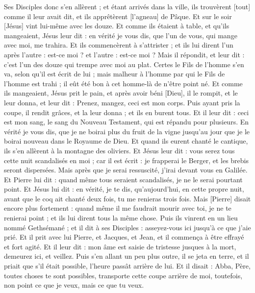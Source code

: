 \begin{multicols}{2}
Ses Disciples donc s'en allèrent ; et étant arrivés dans la ville, ils trouvèrent [tout] comme il leur avait dit, et ils apprêtèrent [l'agneau] de Pâque.
Et sur le soir [Jésus] vint lui-même avec les douze.
Et comme ils étaient à table, et qu'ils mangeaient, Jésus leur dit : en vérité je vous dis, que l'un de vous, qui mange avec moi, me trahira.
Et ils commencèrent à s'attrister ; et ils lui dirent l'un après l'autre : est-ce moi ? et l'autre : est-ce moi ?
Mais il répondit, et leur dit : c'est l'un des douze qui trempe avec moi au plat.
Certes le Fils de l'homme s'en va, selon qu'il est écrit de lui ; mais malheur à l'homme par qui le Fils de l'homme est trahi ; il eût été bon à cet homme-là de n'être point né.
Et comme ils mangeaient, Jésus prit le pain, et après avoir béni [Dieu], il le rompit, et le leur donna, et leur dit : Prenez, mangez, ceci est mon corps.
Puis ayant pris la coupe, il rendit grâces, et la leur donna ; et ils en burent tous.
Et il leur dit : ceci est mon sang, le sang du Nouveau Testament, qui est répandu pour plusieurs.
En vérité je vous dis, que je ne boirai plus du fruit de la vigne jusqu'au jour que je le boirai nouveau dans le Royaume de Dieu.
Et quand ils eurent chanté le cantique, ils s'en allèrent à la montagne des oliviers.
Et Jésus leur dit : vous serez tous cette nuit scandalisés en moi ; car il est écrit : je frapperai le Berger, et les brebis seront dispersées.
Mais après que je serai ressuscité, j'irai devant vous en Galilée.
Et Pierre lui dit : quand même tous seraient scandalisés, je ne le serai pourtant point.
Et Jésus lui dit : en vérité, je te dis, qu'aujourd'hui, en cette propre nuit, avant que le coq ait chanté deux fois, tu me renieras trois fois.
Mais [Pierre] disait encore plus fortement : quand même il me faudrait mourir avec toi, je ne te renierai point ; et ils lui dirent tous la même chose.
Puis ils vinrent en un lieu nommé Gethsémané ; et il dit à ses Disciples : asseyez-vous ici jusqu'à ce que j’aie prié.
Et il prit avec lui Pierre, et Jacques, et Jean, et il commença à être effrayé et fort agité.
Et il leur dit : mon âme est saisie de tristesse jusques à la mort, demeurez ici, et veillez.
Puis s'en allant un peu plus outre, il se jeta en terre, et il priait que s'il était possible, l'heure passât arrière de lui.
Et il disait : Abba, Père, toutes choses te sont possibles, transporte cette coupe arrière de moi, toutefois, non point ce que je veux, mais ce que tu veux.

\end{multicols}
